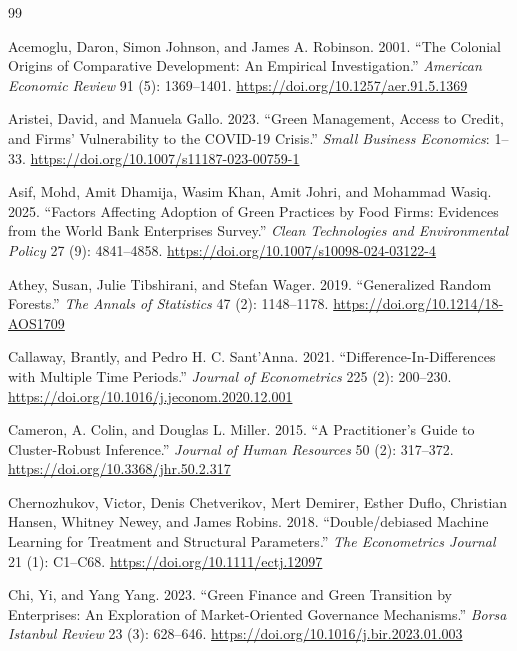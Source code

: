 \begin{thebibliography}{99}

Acemoglu, Daron, Simon Johnson, and James A. Robinson. 2001. ``The Colonial Origins of Comparative Development: An Empirical Investigation.'' \emph{American Economic Review} 91 (5): 1369--1401. \url{https://doi.org/10.1257/aer.91.5.1369}

Aristei, David, and Manuela Gallo. 2023. ``Green Management, Access to Credit, and Firms' Vulnerability to the {COVID-19} Crisis.'' \emph{Small Business Economics}: 1--33. \url{https://doi.org/10.1007/s11187-023-00759-1}

Asif, Mohd, Amit Dhamija, Wasim Khan, Amit Johri, and Mohammad Wasiq. 2025. ``Factors Affecting Adoption of Green Practices by Food Firms: Evidences from the {World Bank Enterprises Survey}.'' \emph{Clean Technologies and Environmental Policy} 27 (9): 4841--4858. \url{https://doi.org/10.1007/s10098-024-03122-4}

Athey, Susan, Julie Tibshirani, and Stefan Wager. 2019. ``Generalized Random Forests.'' \emph{The Annals of Statistics} 47 (2): 1148--1178. \url{https://doi.org/10.1214/18-AOS1709}

Callaway, Brantly, and Pedro H. C. Sant'Anna. 2021. ``Difference-In-Differences with Multiple Time Periods.'' \emph{Journal of Econometrics} 225 (2): 200--230. \url{https://doi.org/10.1016/j.jeconom.2020.12.001}

Cameron, A. Colin, and Douglas L. Miller. 2015. ``A Practitioner's Guide to Cluster-Robust Inference.'' \emph{Journal of Human Resources} 50 (2): 317--372. \url{https://doi.org/10.3368/jhr.50.2.317}

Chernozhukov, Victor, Denis Chetverikov, Mert Demirer, Esther Duflo, Christian Hansen, Whitney Newey, and James Robins. 2018. ``Double/debiased Machine Learning for Treatment and Structural Parameters.'' \emph{The Econometrics Journal} 21 (1): C1--C68. \url{https://doi.org/10.1111/ectj.12097}

Chi, Yi, and Yang Yang. 2023. ``Green Finance and Green Transition by Enterprises: An Exploration of Market-Oriented Governance Mechanisms.'' \emph{Borsa Istanbul Review} 23 (3): 628--646. \url{https://doi.org/10.1016/j.bir.2023.01.003}


\end{thebibliography}
